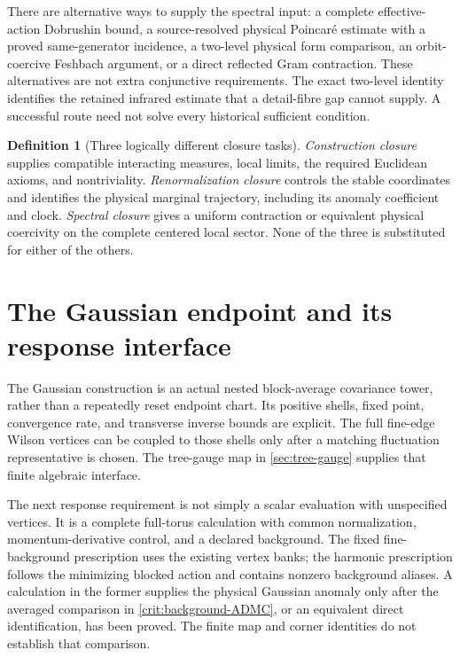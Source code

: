 \documentclass[11pt,oneside,openany]{book}
\theoremstyle{definition}
\newtheorem{definition}[definition]{Definition}
\theoremstyle{remark}
\begin{document}
There are alternative ways to supply the spectral input: a complete
effective-action Dobrushin bound, a source-resolved physical
Poincar\'e estimate with a proved same-generator incidence, a two-level
physical form comparison, an orbit-coercive Feshbach argument, or a direct
reflected Gram contraction. These alternatives are not extra conjunctive
requirements. The exact two-level identity identifies the retained
infrared estimate that a detail-fibre gap cannot supply. A successful
route need not solve every historical sufficient condition.

\begin{definition}[Three logically different closure tasks]
\label{def:three-tasks}
\emph{Construction closure} supplies compatible interacting measures, local limits, the required Euclidean axioms, and nontriviality. \emph{Renormalization closure} controls the stable coordinates and identifies the physical marginal trajectory, including its anomaly coefficient and clock. \emph{Spectral closure} gives a uniform contraction or equivalent physical coercivity on the complete centered local sector. None of the three is substituted for either of the others.
\end{definition}

\section{The Gaussian endpoint and its response interface}
The Gaussian construction is an actual nested block-average covariance
tower, rather than a repeatedly reset endpoint chart. Its positive shells,
fixed point, convergence rate, and transverse inverse bounds are explicit.
The full fine-edge Wilson vertices can be coupled to those shells only
after a matching fluctuation representative is chosen. The tree-gauge map
in \cref{sec:tree-gauge} supplies that finite algebraic interface.

The next response requirement is not simply a scalar evaluation with
unspecified vertices. It is a complete full-torus calculation with common
normalization, momentum-derivative control, and a declared background.
The fixed fine-background prescription uses the existing vertex banks;
the harmonic prescription follows the minimizing blocked action and
contains nonzero background aliases. A calculation in the former supplies
the physical Gaussian anomaly only after the averaged comparison in
\cref{crit:background-ADMC}, or an equivalent direct identification, has
been proved. The finite map and corner identities do not establish that
comparison.
\end{document}

